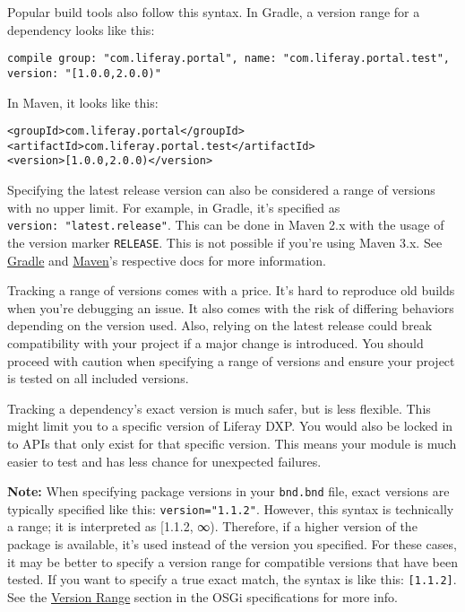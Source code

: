 Popular build tools also follow this syntax. In Gradle, a version range
for a dependency looks like this:

\begin{verbatim}
compile group: "com.liferay.portal", name: "com.liferay.portal.test", version: "[1.0.0,2.0.0)"
\end{verbatim}

In Maven, it looks like this:

\begin{verbatim}
<groupId>com.liferay.portal</groupId>
<artifactId>com.liferay.portal.test</artifactId>
<version>[1.0.0,2.0.0)</version>
\end{verbatim}

Specifying the latest release version can also be considered a range of
versions with no upper limit. For example, in Gradle, it's specified as
\texttt{version:\ "latest.release"}. This can be done in Maven 2.x with
the usage of the version marker \texttt{RELEASE}. This is not possible
if you're using Maven 3.x. See \href{https://gradle.org/docs}{Gradle}
and \href{http://maven.apache.org/guides/}{Maven}'s respective docs for
more information.

Tracking a range of versions comes with a price. It's hard to reproduce
old builds when you're debugging an issue. It also comes with the risk
of differing behaviors depending on the version used. Also, relying on
the latest release could break compatibility with your project if a
major change is introduced. You should proceed with caution when
specifying a range of versions and ensure your project is tested on all
included versions.

Tracking a dependency's exact version is much safer, but is less
flexible. This might limit you to a specific version of Liferay DXP. You
would also be locked in to APIs that only exist for that specific
version. This means your module is much easier to test and has less
chance for unexpected failures.

\noindent\hrulefill

\textbf{Note:} When specifying package versions in your \texttt{bnd.bnd}
file, exact versions are typically specified like this:
\texttt{version="1.1.2"}. However, this syntax is technically a range;
it is interpreted as {[}1.1.2, ∞). Therefore, if a higher version of the
package is available, it's used instead of the version you specified.
For these cases, it may be better to specify a version range for
compatible versions that have been tested. If you want to specify a true
exact match, the syntax is like this: \texttt{{[}1.1.2{]}}. See the
\href{https://osgi.org/specification/osgi.core/7.0.0/framework.module.html\#i3189032}{Version
Range} section in the OSGi specifications for more info.

